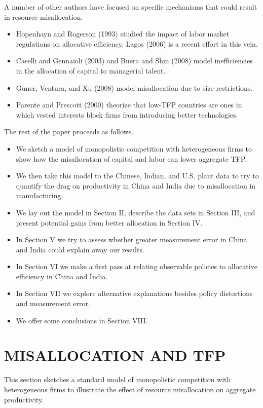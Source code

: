 \documentclass{article}
\begin{document}
A number of other authors have focused on specific mechanisms that could result in resource misallocation. 
\begin{itemize}
    \item Hopenhayn and Rogerson (1993) studied the impact of labor market regulations on allocative efficiency. Lagos (2006) is a recent
    effort in this vein.
    \item Caselli and Gennaioli (2003) and Buera and Shin (2008) model inefficiencies in the allocation of capital to managerial talent.
    \item Guner, Ventura, and Xu (2008) model misallocation due to size restrictions. 
    \item Parente and Prescott (2000) theorize that low-TFP countries are ones in which vested interests block firms from introducing better technologies.
\end{itemize}

The rest of the paper proceeds as follows.
\begin{itemize}
    \item We sketch a model of monopolistic competition with heterogeneous firms to show how the misallocation of capital and labor can lower aggregate TFP.
    \item We then take this model to the Chinese, Indian, and U.S. plant data to try to quantify the drag on productivity in China and India due to misallocation in manufacturing. 
    \item We lay out the model in Section II, describe the data sets in Section III, and present potential gains from better allocation in Section IV. 
    \item In Section V we try to assess whether greater measurement error in China and India could explain away our results. 
    \item In Section VI we make a first pass at relating observable policies to allocative efficiency in China and India. 
    \item In Section VII we explore alternative explanations besides policy distortions and measurement error. 
    \item We offer some conclusions in Section VIII.
\end{itemize}

\section*{MISALLOCATION AND TFP}

This section sketches a standard model of monopolistic competition with heterogeneous firms to illustrate the effect of resource misallocation on aggregate productivity. 
\end{document}
